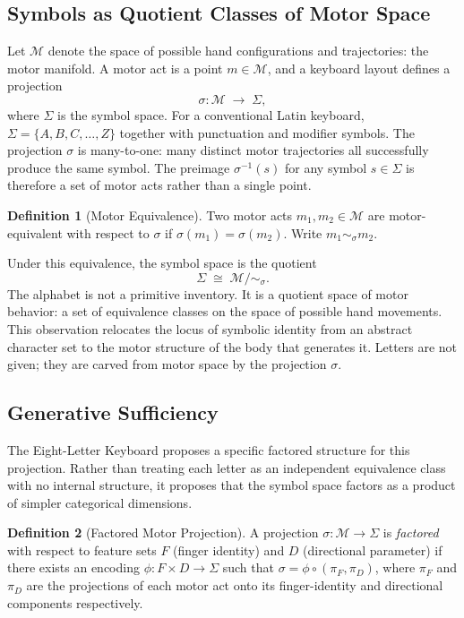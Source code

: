 \documentclass[12pt,a4paper]{article}
\theoremstyle{plain}
\theoremstyle{definition}
\newtheorem{definition}{Definition}
\theoremstyle{remark}
\begin{document}
\subsection{Symbols as Quotient Classes of Motor Space}

Let $\mathcal{M}$ denote the space of possible hand configurations and
trajectories: the motor manifold. A motor act is a point $m \in \mathcal{M}$,
and a keyboard layout defines a projection
\[
  \sigma : \mathcal{M} \;\to\; \Sigma,
\]
where $\Sigma$ is the symbol space. For a conventional Latin keyboard,
$\Sigma = \{A, B, C, \ldots, Z\}$ together with punctuation and modifier
symbols. The projection $\sigma$ is many-to-one: many distinct motor
trajectories all successfully produce the same symbol. The preimage
$\sigma^{-1}(s)$ for any symbol $s \in \Sigma$ is therefore a set of
motor acts rather than a single point.

\begin{definition}[Motor Equivalence]
Two motor acts $m_1, m_2 \in \mathcal{M}$ are motor-equivalent with
respect to $\sigma$ if $\sigma(m_1) = \sigma(m_2)$. Write
$m_1 \sim_\sigma m_2$.
\end{definition}

Under this equivalence, the symbol space is the quotient
\[
  \Sigma \;\cong\; \mathcal{M} / {\sim_\sigma}.
\]
The alphabet is not a primitive inventory. It is a quotient space of motor
behavior: a set of equivalence classes on the space of possible hand movements.
This observation relocates the locus of symbolic identity from an abstract
character set to the motor structure of the body that generates it. Letters
are not given; they are carved from motor space by the projection $\sigma$.

\subsection{Generative Sufficiency}

The Eight-Letter Keyboard proposes a specific factored structure for this
projection. Rather than treating each letter as an independent equivalence
class with no internal structure, it proposes that the symbol space factors
as a product of simpler categorical dimensions.

\begin{definition}[Factored Motor Projection]
A projection $\sigma : \mathcal{M} \to \Sigma$ is \emph{factored} with
respect to feature sets $F$ (finger identity) and $D$ (directional parameter)
if there exists an encoding $\phi : F \times D \to \Sigma$ such that
$\sigma = \phi \circ (\pi_F, \pi_D)$, where $\pi_F$ and $\pi_D$ are the
projections of each motor act onto its finger-identity and directional
components respectively.
\end{definition}
\end{document}

